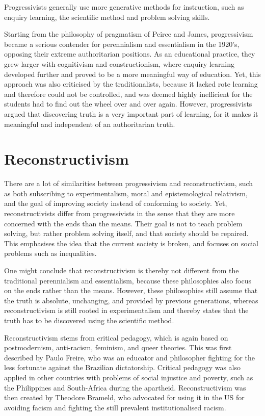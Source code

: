 Progressivists generally use more generative methods for instruction, such as enquiry learning, the scientific method and problem solving skills.

Starting from the philosophy of pragmatism of Peirce and James, progressivism became a serious contender for perennialism and essentialism in the 1920's, opposing their extreme authoritarian positions. As an educational practice, they grew larger with cognitivism and constructionism, where enquiry learning developed further and proved to be a more meaningful way of education. Yet, this approach was also criticised by the traditionalists, because it lacked rote learning and therefore could not be controlled, and was deemed highly inefficient for the students had to find out the wheel over and over again. However, progressivists argued that discovering truth is a very important part of learning, for it makes it meaningful and independent of an authoritarian truth.

\section{Reconstructivism}

There are a lot of similarities between progressivism and reconstructivism, such as both subscribing to experimentalism, moral and epistemological relativism, and the goal of improving society instead of conforming to society. Yet, reconstructivists differ from progressivists in the sense that they are more concerned with the ends than the means. Their goal is not to teach problem solving, but rather problem solving itself, and that society should be repaired. This emphasises the idea that the current society is broken, and focuses on social problems such as inequalities.

One might conclude that reconstructivism is thereby not different from the traditional perennialism and essentialism, because these philosophies also focus on the ends rather than the means. However, these philosophies still assume that the truth is absolute, unchanging, and provided by previous generations, whereas reconstructivism is still rooted in experimentalism and thereby states that the truth has to be discovered using the scientific method.

Reconstructivism stems from critical pedagogy, which is again based on postmodernism, anti-racism, feminism, and queer theories. This was first described by Paulo Freire, who was an educator and philosopher fighting for the less fortunate against the Brazilian dictatorship. Critical pedagogy was also applied in other countries with problems of social injustice and poverty, such as the Philippines and South-Africa during the apartheid. Reconstructivism was then created by Theodore Brameld, who advocated for using it in the US for avoiding facism and fighting the still prevalent institutionalised racism.

